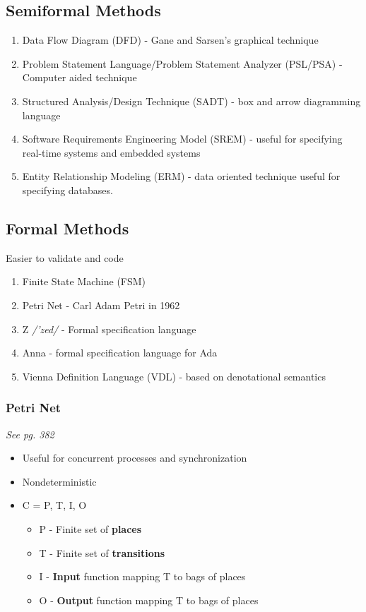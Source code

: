 \documentclass{report}
\begin{document}
			\subsection{Semiformal Methods}
				\begin{enumerate}
					\item Data Flow Diagram (DFD) - Gane and Sarsen's graphical technique
					\item Problem Statement Language/Problem Statement Analyzer (PSL/PSA) - Computer aided technique
					\item Structured Analysis/Design Technique (SADT) - box and arrow diagramming language
					\item Software Requirements Engineering Model (SREM) - useful for specifying real-time systems and embedded systems
					\item Entity Relationship Modeling (ERM) - data oriented technique useful for specifying databases.
				\end{enumerate}
			\subsection{Formal Methods}
				Easier to validate and code
				\begin{enumerate}
					\item Finite State Machine (FSM)
					\item Petri Net - Carl Adam Petri in 1962
					\item Z \textit{/'zed/} - Formal specification language
					\item Anna - formal specification language for Ada
					\item Vienna Definition Language (VDL) - based on denotational semantics
				\end{enumerate}
				\subsubsection{Petri Net}
					\textit{See pg. 382}
					\begin{itemize}
						\item Useful for concurrent processes and synchronization
						\item Nondeterministic
						\item C = P, T, I, O
							\begin{itemize}
								\item P - Finite set of \textbf{places}	
								\item T - Finite set of \textbf{transitions}
								\item I - \textbf{Input} function mapping T to bags of places
								\item O - \textbf{Output} function mapping T to bags of places
							\end{itemize}
					\end{itemize}
\end{document}
